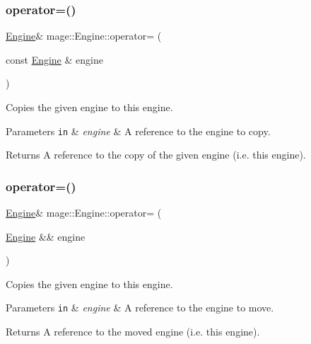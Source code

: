 \subsubsection{\texorpdfstring{operator=()}{operator=()}\hspace{0.1cm}{\footnotesize\ttfamily [1/2]}}
{\footnotesize\ttfamily \mbox{\hyperlink{classmage_1_1_engine}{Engine}}\& mage\+::\+Engine\+::operator= (\begin{DoxyParamCaption}\item[{const \mbox{\hyperlink{classmage_1_1_engine}{Engine}} \&}]{engine }\end{DoxyParamCaption})\hspace{0.3cm}{\ttfamily [delete]}}

Copies the given engine to this engine.


\begin{DoxyParams}[1]{Parameters}
\mbox{\tt in}  & {\em engine} & A reference to the engine to copy. \\
\hline
\end{DoxyParams}
\begin{DoxyReturn}{Returns}
A reference to the copy of the given engine (i.\+e. this engine). 
\end{DoxyReturn}
\mbox{\label{classmage_1_1_engine_a22607a263e0be5e179cc0e4bf13b18f7}} 
\subsubsection{\texorpdfstring{operator=()}{operator=()}\hspace{0.1cm}{\footnotesize\ttfamily [2/2]}}
{\footnotesize\ttfamily \mbox{\hyperlink{classmage_1_1_engine}{Engine}}\& mage\+::\+Engine\+::operator= (\begin{DoxyParamCaption}\item[{\mbox{\hyperlink{classmage_1_1_engine}{Engine}} \&\&}]{engine }\end{DoxyParamCaption})\hspace{0.3cm}{\ttfamily [delete]}}

Copies the given engine to this engine.


\begin{DoxyParams}[1]{Parameters}
\mbox{\tt in}  & {\em engine} & A reference to the engine to move. \\
\hline
\end{DoxyParams}
\begin{DoxyReturn}{Returns}
A reference to the moved engine (i.\+e. this engine). 
\end{DoxyReturn}
\mbox{\label{classmage_1_1_engine_a0999f6eb6b09ad015103a46509b333b8}} 
